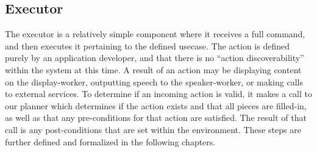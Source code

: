 \subsection{Executor}

The executor is a relatively simple component where it receives a full command,
and then executes it pertaining to the defined usecase. The action is defined purely
by an application developer, and that there is no ``action discoverability'' within
the system at this time. A result of an action may be displaying content on the
display-worker, outputting speech to the speaker-worker, or making calls to external
services. To determine if an incoming action is valid, it makes a call to our planner
which determines if the action exists and that all pieces are filled-in, as well as that
any pre-conditions for that action are satisfied. The result of that call is any
post-conditions that are set within the environment. These steps are further defined
and formalized in the following chapters.
